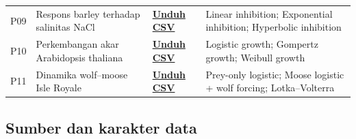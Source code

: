\documentclass[11pt,a4paper]{article}
\begin{document}
\begin{longtable}{L{0.7cm} L{4.0cm} L{2.0cm} L{7.2cm}}
P09 & Respons barley terhadap salinitas NaCl & \href{https://raw.githubusercontent.com/fauzirifky/Pemodelan-Komputasi-dan-Analisis-Numerik/main/Tugas_Besar/data/P09_barley_salinity.csv}{\textbf{Unduh CSV}} & Linear inhibition; Exponential inhibition; Hyperbolic inhibition \\
P10 & Perkembangan akar Arabidopsis thaliana & \href{https://raw.githubusercontent.com/fauzirifky/Pemodelan-Komputasi-dan-Analisis-Numerik/main/Tugas_Besar/data/P10_arabidopsis_root.csv}{\textbf{Unduh CSV}} & Logistic growth; Gompertz growth; Weibull growth \\
P11 & Dinamika wolf–moose Isle Royale & \href{https://raw.githubusercontent.com/fauzirifky/Pemodelan-Komputasi-dan-Analisis-Numerik/main/Tugas_Besar/data/P11_wolf_moose.csv}{\textbf{Unduh CSV}} & Prey-only logistic; Moose logistic + wolf forcing; Lotka–Volterra \\
\bottomrule
\end{longtable}

\subsection{Sumber dan karakter data}
\end{document}
